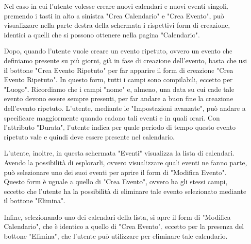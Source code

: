 Nel caso in cui l'utente volesse creare nuovi calendari e nuovi eventi singoli, premendo i tasti in alto a sinistra "Crea Calendario" e "Crea Evento", può visualizzare nella parte destra della schermata i rispettivi form di creazione, identici a quelli che si possono ottenere nella pagina "Calendario".

Dopo, quando l'utente vuole creare un evento ripetuto, ovvero un evento che definiamo presente su più giorni, già in fase di creazione dell'evento, basta che usi il bottone "Crea Evento Ripetuto" per far apparire il form di creazione "Crea Evento Ripetuto". In questo form, tutti i campi sono compilabili, eccetto per "Luogo". Ricordiamo che i campi "nome" e, almeno, una data su cui cade tale evento devono essere sempre presenti, per far andare a buon fine la creazione dell'evento ripetuto. L'utente, mediante le "Impostazioni avanzate", può andare a specificare maggiormente quando cadono tali eventi e in quali orari. Con l'attributo "Durata", l'utente indica per quale periodo di tempo questo evento ripetuto vale e quindi deve essere presente nel calendario.

L'utente, inoltre, in questa schermata "Eventi" visualizza la lista di calendari. Avendo la possibilità di esplorarli, ovvero visualizzare quali eventi ne fanno parte, può selezionare uno dei suoi eventi per aprire il form di "Modifica Evento". Questo form è uguale a quello di "Crea Evento", ovvero ha gli stessi campi, eccetto che l'utente ha la possibilità di eliminare tale evento selezionato mediante il bottone "Elimina".


Infine, selezionando uno dei calendari della lista, si apre il form di "Modifica Calendario", che è identico a quello di "Crea Evento", eccetto per la presenza del bottone "Elimina", che l'utente può utilizzare per eliminare tale calendario.